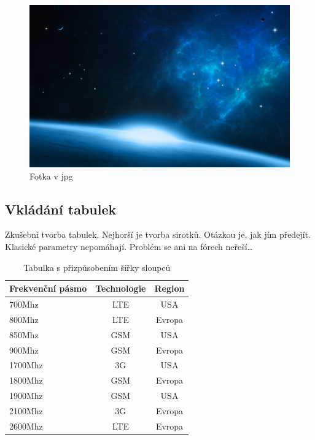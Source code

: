 \documentclass[12pt,a4paper,oneside]{article}
\numberwithin{equation}{section} %
\numberwithin{figure}{section} %
\numberwithin{table}{section} %
\begin{document}
\begin{figure}[h] %
\begin{center}
\includegraphics[width=15cm]{58.jpg} %
\caption{Fotka v jpg} %
\end{center}
\end{figure}


\subsection{Vkládání tabulek}
Zkušební tvorba tabulek. Nejhorší je tvorba sirotků. Otázkou je, jak jím předejít. Klasické parametry nepomáhají. Problém se ani na fórech neřeší\ldots
\begin{table}[h] %
\caption{Tabulka s přizpůsobením šířky sloupců}
\begin{center} %
\begin{tabular}{|l|c|c|} %
\hline %
\textbf{Frekvenční pásmo} & \textbf{Technologie} & \textbf{Region} \\ %
\hline %
700Mhz & LTE & USA \\ %
\hline %
800Mhz & LTE & Evropa \\ %
\hline %
850Mhz & GSM & USA \\ %
\hline 
900Mhz & GSM & Evropa \\ 
\hline
1700Mhz & 3G & USA \\ 
\hline
1800Mhz & GSM & Evropa \\ 
\hline
1900Mhz & GSM & USA \\ 
\hline 
2100Mhz & 3G & Evropa \\ 
\hline
2600Mhz & LTE & Evropa \\ 
\hline
\end{tabular}
\end{center}
\end{table} 
\end{document}
